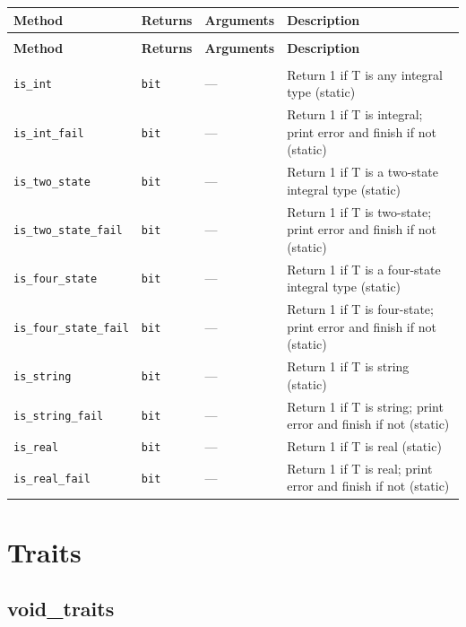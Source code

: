 \documentclass[11pt,letterpaper]{report}
\begin{document}
\begin{xltabular}{\linewidth}{>{\small}p{1.35in} >{\small}p{1.25in} >{\small}p{0.95in} >{\small}X}
\toprule
\textbf{Method} & \textbf{Returns} & \textbf{Arguments} & \textbf{Description} \\
\midrule
\endfirsthead
{} \\
\midrule
\textbf{Method} & \textbf{Returns} & \textbf{Arguments} & \textbf{Description} \\
\midrule
\endhead
\midrule
{} \\
\endfoot
\bottomrule
\endlastfoot
\texttt{is\_int} & \texttt{bit} & --- & Return 1 if T is any integral type (static) \\
\texttt{is\_int\_fail} & \texttt{bit} & --- & Return 1 if T is integral; print error and finish if not (static) \\
\texttt{is\_two\_state} & \texttt{bit} & --- & Return 1 if T is a two-state integral type (static) \\
\texttt{is\_two\_state\_fail} & \texttt{bit} & --- & Return 1 if T is two-state; print error and finish if not (static) \\
\texttt{is\_four\_state} & \texttt{bit} & --- & Return 1 if T is a four-state integral type (static) \\
\texttt{is\_four\_state\_fail} & \texttt{bit} & --- & Return 1 if T is four-state; print error and finish if not (static) \\
\texttt{is\_string} & \texttt{bit} & --- & Return 1 if T is string (static) \\
\texttt{is\_string\_fail} & \texttt{bit} & --- & Return 1 if T is string; print error and finish if not (static) \\
\texttt{is\_real} & \texttt{bit} & --- & Return 1 if T is real (static) \\
\texttt{is\_real\_fail} & \texttt{bit} & --- & Return 1 if T is real; print error and finish if not (static) \\
\end{xltabular}

\chapter{Traits}

\section{void\_traits}
\label{cls:voidtraits}
\end{document}
